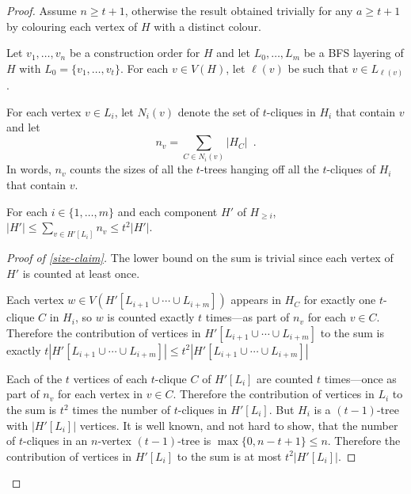 \documentclass[kpfonts]{patmorin}
\theoremstyle{named}
\begin{document}
\begin{proof}
    Assume $n\ge t+1$, otherwise the result obtained trivially for any $a\ge t+1$ by colouring each vertex of $H$ with a distinct colour.

    Let $v_1,\ldots,v_n$ be a construction order for $H$ and let $L_0,\ldots,L_m$ be a BFS layering of $H$ with $L_0=\{v_1,\ldots,v_t\}$.  For each $v\in V(H)$, let $\ell(v)$ be such that $v\in L_{\ell(v)}$.

    For each vertex $v\in L_i$, let $N_i(v)$ denote the set of $t$-cliques in $H_i$ that contain $v$ and let
    \begin{equation}
        n_v=\sum_{C\in N_i(v)}|H_{C}| \enspace . \label{nv}
    \end{equation}
    In words, $n_v$ counts the sizes of all the $t$-trees hanging off all the $t$-cliques of $H_i$ that contain $v$.

    \begin{clm}\label{size-claim}
        For each $i\in\{1,\ldots,m\}$ and each component $H'$ of $H_{\ge i}$, $|H'|\le \sum_{v\in H'[L_i]} n_v \le t^2|H'|$.
    \end{clm}

    \begin{proof}[Proof of \cref{size-claim}]
        The lower bound on the sum is trivial since each vertex of $H'$ is counted at least once.

        Each vertex $w\in V(H'[L_{i+1}\cup\cdots\cup L_{i+m}])$ appears in $H_C$ for exactly one $t$-clique $C$ in $H_i$, so $w$ is counted exactly $t$ times---as part of $n_v$ for each $v\in C$. Therefore the contribution of vertices in $H'[L_{i+1}\cup\cdots\cup L_{i+m}]$ to the sum is exactly $t|H'[L_{i+1}\cup\cdots\cup L_{i+m}]|\le t^2|H'[L_{i+1}\cup\cdots\cup L_{i+m}]|$

        Each of the $t$ vertices of each $t$-clique $C$ of $H'[L_i]$ are counted $t$ times---once as part of $n_v$ for each vertex in $v\in C$. Therefore the contribution of vertices in $L_i$ to the sum is $t^2$ times the number of $t$-cliques in $H'[L_i]$.  But $H_i$ is a $(t-1)$-tree with $|H'[L_i]|$ vertices.  It is well known, and not hard to show, that the number of $t$-cliques in an $n$-vertex $(t-1)$-tree is $\max\{0,n-t+1\}\le n$. Therefore the contribution of vertices in $H'[L_i]$ to the sum is at most $t^2|H'[L_i]|$.


\end{proof}
\end{proof}
\end{document}
